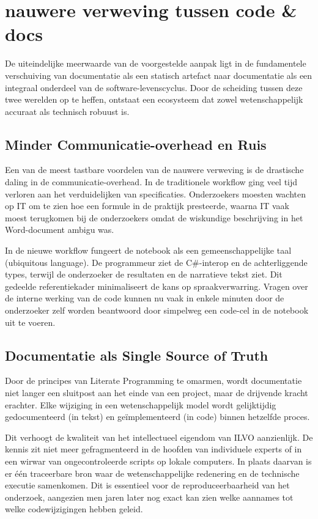 \chapter{nauwere verweving tussen code \& docs}
\label{ch:verweving_code_docs}

De uiteindelijke meerwaarde van de voorgestelde aanpak ligt in de fundamentele verschuiving van documentatie als een statisch artefact naar documentatie als een integraal onderdeel van de software-levenscyclus. Door de scheiding tussen deze twee werelden op te heffen, ontstaat een ecosysteem dat zowel wetenschappelijk accuraat als technisch robuust is.

\section{Minder Communicatie-overhead en Ruis}
Een van de meest tastbare voordelen van de nauwere verweving is de drastische daling in de communicatie-overhead. In de traditionele workflow ging veel tijd verloren aan het verduidelijken van specificaties. Onderzoekers moesten wachten op IT om te zien hoe een formule in de praktijk presteerde, waarna IT vaak moest terugkomen bij de onderzoekers omdat de wiskundige beschrijving in het Word-document ambigu was.

In de nieuwe workflow fungeert de notebook als een gemeenschappelijke taal (ubiquitous language). De programmeur ziet de C\#-interop en de achterliggende types, terwijl de onderzoeker de resultaten en de narratieve tekst ziet. Dit gedeelde referentiekader minimaliseert de kans op spraakverwarring. Vragen over de interne werking van de code kunnen nu vaak in enkele minuten door de onderzoeker zelf worden beantwoord door simpelweg een code-cel in de notebook uit te voeren.

\section{Documentatie als \textquotedbl Single Source of Truth\textquotedbl}
Door de principes van Literate Programming te omarmen, wordt documentatie niet langer een sluitpost aan het einde van een project, maar de drijvende kracht erachter. Elke wijziging in een wetenschappelijk model wordt gelijktijdig gedocumenteerd (in tekst) en geïmplementeerd (in code) binnen hetzelfde proces.

Dit verhoogt de kwaliteit van het intellectueel eigendom van ILVO aanzienlijk. De kennis zit niet meer gefragmenteerd in de hoofden van individuele experts of in een wirwar van ongecontroleerde scripts op lokale computers. In plaats daarvan is er één traceerbare bron waar de wetenschappelijke redenering en de technische executie samenkomen. Dit is essentieel voor de reproduceerbaarheid van het onderzoek, aangezien men jaren later nog exact kan zien welke aannames tot welke codewijzigingen hebben geleid.

